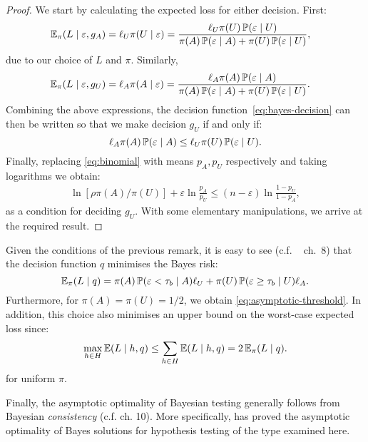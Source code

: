 \documentclass[a4paper]{article}
\newenvironment{IEEEproof}{\begin{proof}}{\end{proof}}
\renewcommand\Pr{\mathop{\mbox{\ensuremath{\mathbb{P}}}}\nolimits}
\newcommand\E{\mathop{\mbox{\ensuremath{\mathbb{E}}}}\nolimits}
\newcommand \thr {\tau}
\newcommand \err {\varepsilon}
\newcommand \pa {p_A}
\newcommand \pu {p_U}
\newcommand \LA {\ell_A}
\newcommand \LU {\ell_U}
\newcommand \decs {g}
\theoremstyle{plain} \newtheorem{remark}{Remark}
\theoremstyle{plain} \newtheorem{definition}{Definition}
\theoremstyle{plain} \newtheorem{example}{Example}
\theoremstyle{plain} \newtheorem{assumption}{Assumption}
\theoremstyle{plain} \newtheorem{conjecture}{Conjecture}
\theoremstyle{plain} \newtheorem{theorem}{Theorem}
\theoremstyle{plain} \newtheorem{proposition}{Proposition}
\theoremstyle{plain} \newtheorem{lemma}{Lemma}
\theoremstyle{plain} \newtheorem{corollary}{Corollary}
\begin{document}
\begin{IEEEproof}
  We start by calculating the expected loss for either decision. First:
  \begin{align*}
    \E_\pi(L \mid \err, \decs_A) &= \LU \pi(U \mid \err) = \frac{\LU
      \pi(U) \Pr(\err \mid U)} {\pi(A) \Pr(\err \mid A) + \pi(U)\Pr(\err \mid U)},
  \end{align*}
  due to our choice of $L$ and $\pi$.  Similarly,
  \begin{align*}
    \E_\pi(L \mid \err, \decs_U) &= \LA \pi(A \mid \err) = \frac{\LA
      \pi(A) \Pr(\err \mid A)} {\pi(A) \Pr(\err \mid A) + \pi(U)\Pr(\err \mid U)}.
  \end{align*}
  Combining the above expressions, the decision
  function~\eqref{eq:bayes-decision} can then be written so that we
  make decision $\decs_U$ if and only if:
  \[
  \LA \pi(A) \Pr(\err \mid A) \leq \LU \pi(U) \Pr(\err \mid U).
  \]
  Finally, replacing \eqref{eq:binomial} with means $\pa, \pu$
  respectively and taking logarithms we obtain:
  \begin{align*}
\ln [\rho \pi(A) / \pi(U)]  + \err \ln \frac{\pa}{\pu}
    \leq
    (n - \err) \ln \frac{1 - \pu}{1 -\pa},
  \end{align*}
  as a condition for deciding $\decs_U$. With some elementary
  manipulations, we arrive at the required result.
\end{IEEEproof}
Given
the conditions of the previous remark, it is easy to see
(c.f. ~\cite{Degroot:OptimalStatisticalDecisions} ch.~8) that the
decision function $q$ minimises the Bayes risk:
\begin{equation}
  \label{eq:bayes-risk}
  \E_\pi(L \mid q)
  =
  \pi(A) \Pr(\err < \thr_b \mid A) \LU
  + \pi(U) \Pr(\err \geq \tau_b \mid U) \LA.
\end{equation}
Furthermore, for $\pi(A) = \pi(U) = 1 / 2$, we obtain
\eqref{eq:asymptotic-threshold}.  In addition, this choice also
minimises an upper bound on the worst-case expected loss since:
\[
\max_{h \in H} \E(L \mid h, q) \leq \sum_{h \in H} \E(L \mid h, q) = 2 \E_\pi(L \mid q).
\]
for uniform $\pi$.

Finally, the asymptotic optimality of Bayesian testing generally
follows from Bayesian {\em consistency}
(c.f. \cite{Degroot:OptimalStatisticalDecisions} ch. 10). More
specifically, \cite{Chernoff:AsymptoticEfficiency} has proved the
asymptotic optimality of Bayes solutions for hypothesis testing of the
type examined here.  



\end{document}
